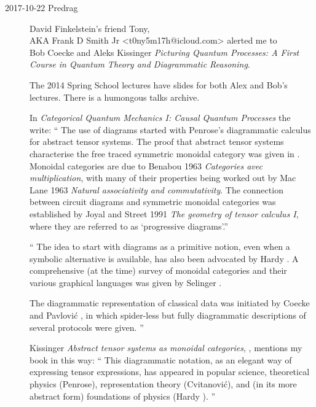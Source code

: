 \begin{description}
\item[2017-10-22 Predrag] David Finkelstein's friend Tony,
\\
AKA Frank D Smith Jr <t0ny5m17h@icloud.com> alerted me to
\\

 {Bob Coecke} and
 {Aleks Kissinger}
{\em Picturing Quantum Processes: A First Course in Quantum Theory and
Diagrammatic Reasoning}.

The 2014 Spring School 
{lectures} have slides for both Alex and Bob's lectures. There is a humongous
 {talks archive}.

In {\em Categorical Quantum Mechanics I: Causal Quantum Processes}
the write: ``
The use of diagrams started with Penrose's diagrammatic calculus for abstract
tensor  systems.  The  proof  that  abstract  tensor  systems
characterise  the free traced symmetric monoidal category was given in
. Monoidal categories are due to Benabou 1963 {\em Categories
avec multiplication}, with many of their properties being worked out by Mac
Lane 1963 {\em Natural associativity and commutativity}.  The connection
between circuit diagrams and symmetric monoidal categories was established by
Joyal and Street 1991 {\em The geometry of tensor calculus I}, where they are
referred to as `progressive diagrams'.''

``
The idea to start with diagrams as a primitive notion, even when a symbolic
alternative is available, has also been advocated by Hardy . A
comprehensive (at the time) survey of monoidal categories and their various
graphical languages was given by Selinger .

The diagrammatic representation of classical data was initiated by Coecke and
Pavlovi\'c , in which spider-less but fully diagrammatic
descriptions of several protocols were given.
''

Kissinger
{\em Abstract tensor systems as monoidal categories},
, mentions my book in this way: ``
This diagrammatic notation, as an elegant way of expressing tensor expressions,
has appeared in popular science, theoretical physics (Penrose), representation
theory (Cvitanovi\'c), and (in its more abstract form) foundations of
physics (Hardy ).
''


\end{description}
